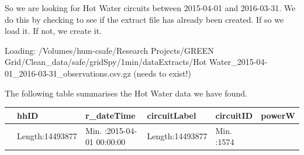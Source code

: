 \documentclass[]{article}
\begin{document}
So we are looking for Hot Water circuits between 2015-04-01 and
2016-03-31. We do this by checking to see if the extract file has
already been created. If so we load it. If not, we create it.

Loading: /Volumes/hum-csafe/Research Projects/GREEN
Grid/Clean\_data/safe/gridSpy/1min/dataExtracts/Hot
Water\_2015-04-01\_2016-03-31\_observations.csv.gz (needs to exist!)

The following table summarises the Hot Water data we have found.

\begin{longtable}[]{@{}llllll@{}}
\toprule
\begin{minipage}[b]{0.03\columnwidth}\raggedright\strut
\strut
\end{minipage} & \begin{minipage}[b]{0.15\columnwidth}\raggedright\strut
hhID\strut
\end{minipage} & \begin{minipage}[b]{0.24\columnwidth}\raggedright\strut
r\_dateTime\strut
\end{minipage} & \begin{minipage}[b]{0.15\columnwidth}\raggedright\strut
circuitLabel\strut
\end{minipage} & \begin{minipage}[b]{0.12\columnwidth}\raggedright\strut
circuitID\strut
\end{minipage} & \begin{minipage}[b]{0.14\columnwidth}\raggedright\strut
powerW\strut
\end{minipage}\tabularnewline
\midrule
\endhead
\begin{minipage}[t]{0.03\columnwidth}\raggedright\strut
\strut
\end{minipage} & \begin{minipage}[t]{0.15\columnwidth}\raggedright\strut
Length:14493877\strut
\end{minipage} & \begin{minipage}[t]{0.24\columnwidth}\raggedright\strut
Min. :2015-04-01 00:00:00\strut
\end{minipage} & \begin{minipage}[t]{0.15\columnwidth}\raggedright\strut
Length:14493877\strut
\end{minipage} & \begin{minipage}[t]{0.12\columnwidth}\raggedright\strut
Min. :1574\strut
\end{minipage} & \begin{minipage}[t]{0.14\columnwidth}\raggedright\strut

\end{minipage}
\end{longtable}
\end{document}
